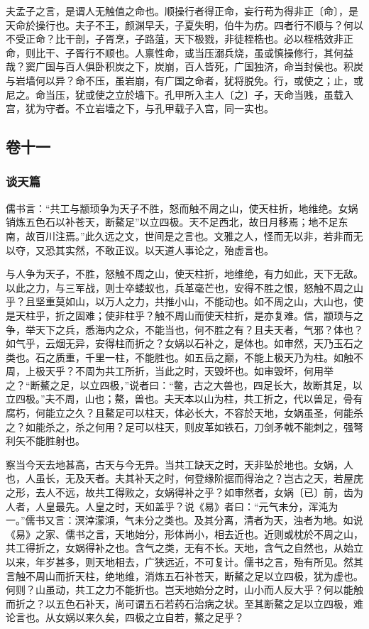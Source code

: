\documentclass[]{article}
\begin{document}
夫孟子之言，是谓人无触值之命也。顺操行者得正命，妄行苟为得非正〔命〕，是天命於操行也。夫子不王，颜渊早夭，子夏失明，伯牛为疠。四者行不顺与？何以不受正命？比干剖，子胥烹，子路菹，天下极戮，非徒桎梏也。必以桎梏效非正命，则比干、子胥行不顺也。人禀性命，或当压溺兵烧，虽或慎操修行，其何益哉？窦广国与百人俱卧积炭之下，炭崩，百人皆死，广国独济，命当封侯也。积炭与岩墙何以异？命不压，虽岩崩，有广国之命者，犹将脱免。行，或使之；止，或尼之。命当压，犹或使之立於墙下。孔甲所入主人〔之〕子，天命当贱，虽载入宫，犹为守者。不立岩墙之下，与孔甲载子入宫，同一实也。

\hypertarget{header-n477}{%
\subsection{卷十一}\label{header-n477}}

\hypertarget{header-n478}{%
\subsubsection{谈天篇}\label{header-n478}}

儒书言：``共工与颛顼争为天子不胜，怒而触不周之山，使天柱折，地维绝。女娲销炼五色石以补苍天，断鰲足''以立四极。天不足西北，故日月移焉；地不足东南，故百川注焉。''此久远之文，世间是之言也。文雅之人，怪而无以非，若非而无以夺，又恐其实然，不敢正议。以天道人事论之，殆虚言也。

与人争为天子，不胜，怒触不周之山，使天柱折，地维绝，有力如此，天下无敌。以此之力，与三军战，则士卒蝼蚁也，兵革毫芒也，安得不胜之恨，怒触不周之山乎？且坚重莫如山，以万人之力，共推小山，不能动也。如不周之山，大山也，使是天柱乎，折之固难；使非柱乎？触不周山而使天柱折，是亦复难。信，颛顼与之争，举天下之兵，悉海内之众，不能当也，何不胜之有？且夫天者，气邪？体也？如气乎，云烟无异，安得柱而折之？女娲以石补之，是体也。如审然，天乃玉石之类也。石之质重，千里一柱，不能胜也。如五岳之巅，不能上极天乃为柱。如触不周，上极天乎？不周为共工所折，当此之时，天毁坏也。如审毁坏，何用举之？``断鰲之足，以立四极，''说者曰：``鳖，古之大兽也，四足长大，故断其足，以立四极。''夫不周，山也；鰲，兽也。夫天本以山为柱，共工折之，代以兽足，骨有腐朽，何能立之久？且鰲足可以柱天，体必长大，不容於天地，女娲虽圣，何能杀之？如能杀之，杀之何用？足可以柱天，则皮革如铁石，刀剑矛戟不能刺之，强弩利矢不能胜射也。

察当今天去地甚高，古天与今无异。当共工缺天之时，天非坠於地也。女娲，人也，人虽长，无及天者。夫其补天之时，何登缘阶据而得治之？岂古之天，若屋庑之形，去人不远，故共工得败之，女娲得补之乎？如审然者，女娲〔已〕前，齿为人者，人皇最先。人皇之时，天如盖乎？说《易》者曰：``元气未分，浑沌为一。''儒书又言：溟涬濛澒，气未分之类也。及其分离，清者为天，浊者为地。如说《易》之家、儒书之言，天地始分，形体尚小，相去近也。近则或枕於不周之山，共工得折之，女娲得补之也。含气之类，无有不长。天地，含气之自然也，从始立以来，年岁甚多，则天地相去，广狭远近，不可复计。儒书之言，殆有所见。然其言触不周山而折天柱，绝地维，消炼五石补苍天，断鰲之足以立四极，犹为虚也。何则？山虽动，共工之力不能折也。岂天地始分之时，山小而人反大乎？何以能触而折之？以五色石补天，尚可谓五石若药石治病之状。至其断鰲之足以立四极，难论言也。从女娲以来久矣，四极之立自若，鰲之足乎？
\end{document}
